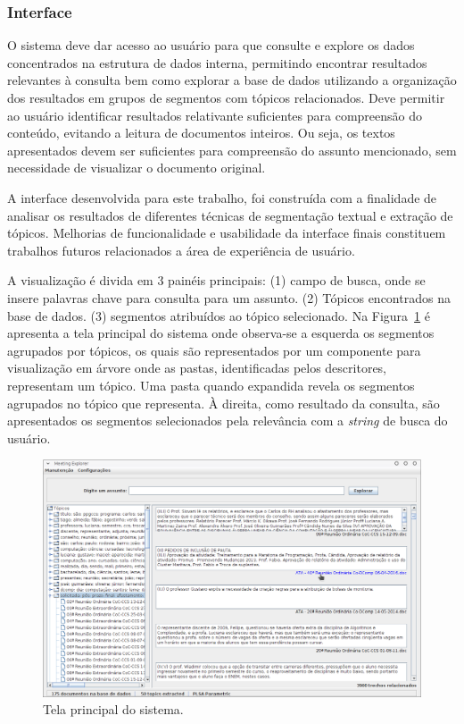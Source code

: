 \subsubsection{Interface}

O sistema deve dar acesso ao usuário para que consulte e explore os dados concentrados na estrutura de dados interna, permitindo encontrar resultados relevantes à consulta bem como explorar a base de dados utilizando a organização dos resultados em grupos de segmentos com tópicos relacionados. Deve permitir ao usuário identificar resultados relativante suficientes para compreensão do conteúdo, evitando a leitura de documentos inteiros. Ou seja, os textos apresentados devem ser suficientes para compreensão do assunto mencionado, sem necessidade de visualizar o documento original.

A interface desenvolvida para este trabalho, foi construída com a finalidade de analisar os resultados de diferentes técnicas de segmentação textual e extração de tópicos. Melhorias de funcionalidade e usabilidade da interface finais constituem trabalhos futuros relacionados a área de experiência de usuário.

A visualização é divida em 3 painéis principais: (1) campo de busca, onde se insere palavras chave para consulta para um assunto. (2) Tópicos encontrados na base de dados. (3) segmentos atribuídos ao tópico selecionado. Na Figura~\ref{fig:tela-principal} é apresenta a tela principal do sistema onde observa-se a esquerda os segmentos agrupados por tópicos, os quais são representados por um componente para visualização em árvore onde as pastas, identificadas pelos descritores, representam um tópico. Uma pasta quando expandida revela os segmentos agrupados no tópico que representa. À direita, como resultado da consulta, são apresentados os segmentos selecionados pela relevância com a \textit{string} de busca do usuário. 

  \begin{figure}[!h]
	  \centering
	  \includegraphics[width=\textwidth]{conteudo/capitulos/figs/tela-principal-2-1.png}
	  \caption{Tela principal do sistema.}
	  \label{fig:tela-principal}
  \end{figure}




